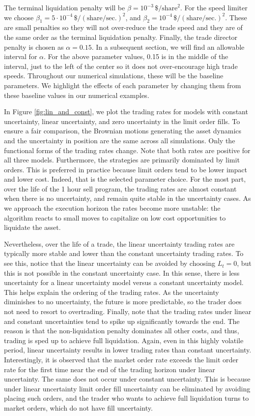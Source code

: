 \documentclass[12pt, letterpaper]{article}
\numberwithin{equation}{section}
\numberwithin{theorem}{section}
\begin{document}
The terminal liquidation penalty will be $\beta=10^{-3}\,\$/\text{share}^2$. For the speed limiter we choose $\beta_1=5\cdot10^{-4}\,\$/(\text{share}/\text{sec.})^2$, and $\beta_2=10^{-4}\,\$/(\text{share}/\text{sec.})^2$. These are small penalties so they will not over-reduce the trade speed and they are of the same order as the terminal liquidation penalty. Finally, the trade director penalty is chosen as $\alpha=0.15$. In a subsequent section, we will find an allowable interval for $\alpha$. For the above parameter values, 0.15 is in the middle of the interval, just to the left of the center so it does not over-encourage high trade speeds. Throughout our numerical simulations, these will be the baseline parameters. We highlight the effects of each parameter by changing them from these baseline values in our numerical examples.


In  Figure \ref{fig:lin_and_const}, we plot  the trading rates for models with constant uncertainty, linear uncertainty, and zero uncertainty in the limit order fills. To ensure   a fair comparison, the Brownian motions generating the asset dynamics and the uncertainty in position are the same across all simulations. Only the functional forms of the trading rates change. Note that   both rates are positive for all three models. Furthermore, the strategies are primarily dominated by limit orders. This is preferred in practice because limit orders tend to be lower impact and lower cost. Indeed, that is the selected parameter choice. For the most part, over the life of the 1 hour sell program, the trading rates  are almost constant when there is no uncertainty, and remain quite  stable in the uncertainty cases. As we approach the execution horizon the rates become more unstable: the algorithm reacts to small moves to capitalize on low cost opportunities to liquidate the asset. 


Nevertheless, over the life of a trade, the linear uncertainty trading rates are typically more stable and lower than the constant uncertainty trading rates.  To see this, notice that   the linear uncertainty can be avoided by choosing $L_t=0$, but this is not possible in the constant uncertainty case.  In this sense, there is less uncertainty for a linear uncertainty model versus a constant uncertainty model. This helps explain   the ordering of the trading rates. As   the uncertainty diminishes to no uncertainty, the future is more predictable, so the trader does not need to resort to overtrading. Finally, note that the  trading rates under linear and constant uncertainties tend to spike up significantly towards the end. The reason is that the non-liquidation penalty dominates all other costs, and thus, trading is sped up to achieve full liquidation. Again, even in this highly volatile period, linear uncertainty results in  lower trading rates than constant uncertainty. Interestingly, it is observed that the market order rate exceeds the limit order rate for the first time near the end of the trading horizon under linear uncertainty. The same does not occur under  constant uncertainty.  This is because under linear uncertainty limit order fill uncertainty can be eliminated by avoiding placing such orders, and the trader who wants to achieve full liquidation turns to market orders, which do not have fill uncertainty. 
\end{document}
